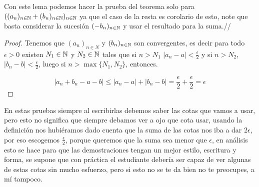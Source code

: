 \begin{itemize}[label={✎}]
Con este lema podemos hacer la prueba del teorema solo para $((a_n)_{n\in \mathbb{N}}+(b_n)_{n\in \mathbb{N}})_{n\in \mathbb{N}}$ ya que el caso de la resta es corolario de esto, note que basta considerar la sucesión $(-b_n)_{n\in \mathbb{N}}$ y usar el resultado para la suma.//

\begin{proof}
    Tenemos que $(a_n)_{n\in N}$ y $(b_n)_{n\in \mathbb{N}}$ son convergentes, es decir para todo $\epsilon>0$ existen $N_1\in \mathbb{N}$ y $N_2\in \mathbb{N}$ tales que si $n>N_1$ $|a_n-a|<\frac{\epsilon}{2}$ y si $n>N_2$, $|b_n-b|<\frac{\epsilon}{2}$, luego si $n>\max\{N_1,N_2\}$, entonces.

    $$|a_n+b_n-a-b|\leq |a_n-a|+|b_n-b|=\frac{\epsilon}{2}+\frac{\epsilon}{2}=\epsilon$$
\end{proof}

\begin{note}
En estas pruebas siempre al escribirlas debemos saber las cotas que vamos a usar, pero esto no significa que siempre debamos ver a ojo que cota usar, usando la definición nos hubiéramos dado cuenta que la suma de las cotas nos iba a dar $2\epsilon$, por eso escogemos $\frac{\epsilon}{2}$, porque queremos que la suma sea menor que $\epsilon$, en análisis esto se hace para que las demostraciones tengan un mejor estilo, escritura y forma, se supone que con práctica el estudiante debería ser capaz de ver algunas de estas cotas sin mucho esfuerzo, pero si esto no se te da bien no te preocupes, a mí tampoco.
\end{note} 








\end{itemize}

 


